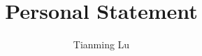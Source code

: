 \documentclass{article}
\title{Personal Statement}
\author{Tianming Lu}
\begin{document}
\maketitle
\paragraph{}
\paragraph{}
\paragraph{}
\paragraph{}
\end{document}

